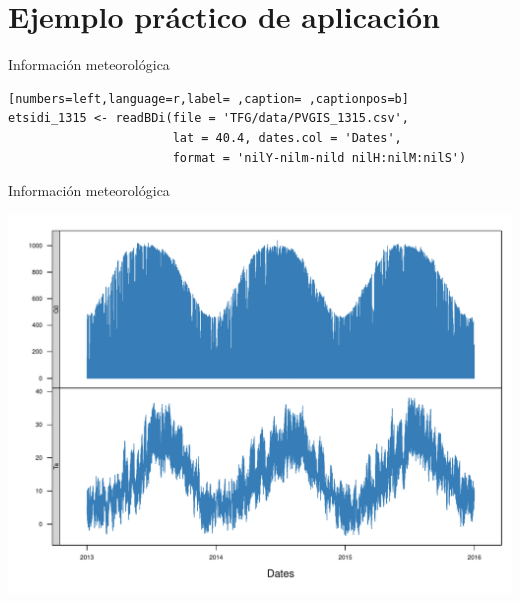 \documentclass[aspectratio=169, usenames,svgnames,dvipsnames]{beamer}
\begin{document}
\section{Ejemplo práctico de aplicación}
\label{sec:org975f51e}
\begin{frame}[label={sec:orgc050b39},fragile]{Información meteorológica}
 \begin{lstlisting}[numbers=left,language=r,label= ,caption= ,captionpos=b]
etsidi_1315 <- readBDi(file = 'TFG/data/PVGIS_1315.csv',
                       lat = 40.4, dates.col = 'Dates',
                       format = 'nilY-nilm-nild nilH:nilM:nilS')
\end{lstlisting}
\end{frame}

\begin{frame}[label={sec:orgcc0b6a2}]{Información meteorológica}
\begin{center}
\includegraphics[height=0.9\textheight]{../figuras/ejemplos3.pdf}
\end{center}
\end{frame}
\end{document}
